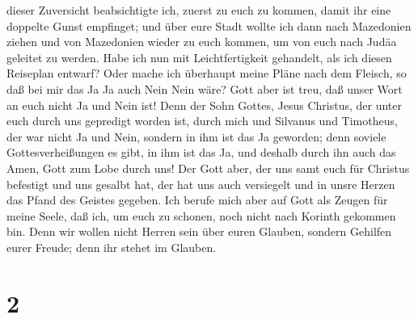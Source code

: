 dieser Zuversicht beabsichtigte ich, zuerst zu euch zu kommen, damit ihr
eine doppelte Gunst empfinget;  und über eure Stadt
wollte ich dann nach Mazedonien ziehen und von Mazedonien wieder zu euch
kommen, um von euch nach Judäa geleitet zu werden.  Habe
ich nun mit Leichtfertigkeit gehandelt, als ich diesen Reiseplan
entwarf? Oder mache ich überhaupt meine Pläne nach dem Fleisch, so daß
bei mir das Ja Ja auch Nein Nein wäre?  Gott aber ist
treu, daß unser Wort an euch nicht Ja und Nein ist!  Denn
der Sohn Gottes, Jesus Christus, der unter euch durch uns gepredigt
worden ist, durch mich und Silvanus und Timotheus, der war nicht Ja und
Nein, sondern in ihm ist das Ja geworden;  denn soviele
Gottesverheißungen es gibt, in ihm ist das Ja, und deshalb durch ihn
auch das Amen, Gott zum Lobe durch uns!  Der Gott aber,
der uns samt euch für Christus befestigt und uns gesalbt hat,
 der hat uns auch versiegelt und in unsre Herzen das
Pfand des Geistes gegeben.  Ich berufe mich aber auf Gott
als Zeugen für meine Seele, daß ich, um euch zu schonen, noch nicht nach
Korinth gekommen bin.  Denn wir wollen nicht Herren sein
über euren Glauben, sondern Gehilfen eurer Freude; denn ihr stehet im
Glauben.

\hypertarget{section-1}{%
\section{2}\label{section-1}}

